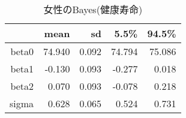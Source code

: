 \begin{table}[ht]
\centering
\begingroup\tiny
\begin{tabular}{rrrrr}
  \hline
 & mean & sd & 5.5\% & 94.5\% \\ 
  \hline
beta0 & 74.940 & 0.092 & 74.794 & 75.086 \\ 
  beta1 & -0.130 & 0.093 & -0.277 & 0.018 \\ 
  beta2 & 0.070 & 0.093 & -0.078 & 0.218 \\ 
  sigma & 0.628 & 0.065 & 0.524 & 0.731 \\ 
   \hline
\end{tabular}
\endgroup
\caption{女性のBayes(健康寿命)} 
\label{table_Gamma_HLE_FA_m}
\end{table}
